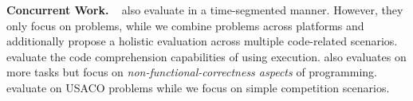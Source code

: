 \vspace{-3pt}
\noindent \textbf{Concurrent Work.} 
~\citep{huang2023competition} also evaluate \llms{} in a time-segmented manner. 
However, they only focus on \codeforces{} problems, while we combine problems across platforms 
and additionally propose a holistic evaluation across multiple code-related scenarios. 
~\cite{liu2024codemind} evaluate the code comprehension capabilities of \llms{} using execution. \citep{singhal2024nofuneval} also evaluates \llms{} on more tasks but focus on \textit{non-functional-correctness aspects} of programming. 
~\citet{shi2024language} evaluate \llms{} on USACO problems while we focus on simple competition scenarios.

